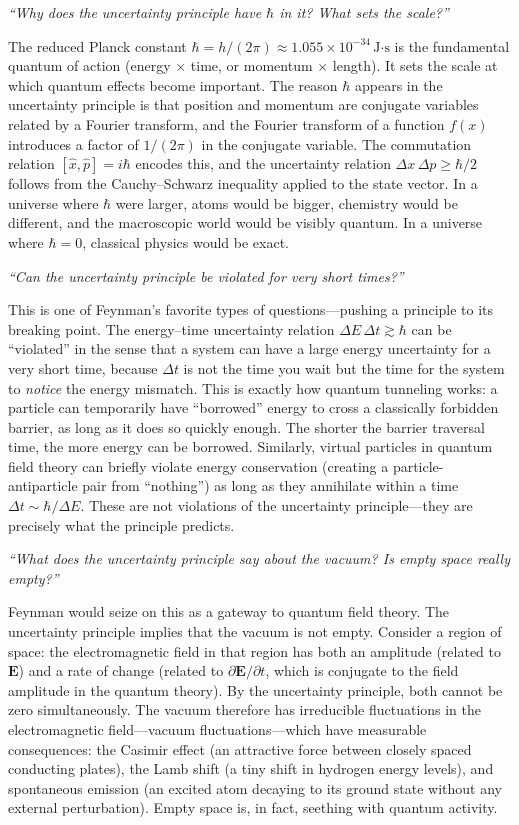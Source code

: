 \documentclass[11pt,openright]{book}
\begin{document}
\textit{``Why does the uncertainty principle have $\hbar$ in it? What sets the scale?''}

The reduced Planck constant $\hbar = h/(2\pi) \approx 1.055 \times 10^{-34}\,\text{J·s}$ is the fundamental quantum of action (energy $\times$ time, or momentum $\times$ length). It sets the scale at which quantum effects become important. The reason $\hbar$ appears in the uncertainty principle is that position and momentum are conjugate variables related by a Fourier transform, and the Fourier transform of a function $f(x)$ introduces a factor of $1/(2\pi)$ in the conjugate variable. The commutation relation $[\hat{x},\hat{p}] = i\hbar$ encodes this, and the uncertainty relation $\Delta x\,\Delta p \geq \hbar/2$ follows from the Cauchy--Schwarz inequality applied to the state vector. In a universe where $\hbar$ were larger, atoms would be bigger, chemistry would be different, and the macroscopic world would be visibly quantum. In a universe where $\hbar = 0$, classical physics would be exact.

\textit{``Can the uncertainty principle be violated for very short times?''}

This is one of Feynman's favorite types of questions---pushing a principle to its breaking point. The energy--time uncertainty relation $\Delta E\,\Delta t \gtrsim \hbar$ can be ``violated'' in the sense that a system can have a large energy uncertainty for a very short time, because $\Delta t$ is not the time you wait but the time for the system to \emph{notice} the energy mismatch. This is exactly how quantum tunneling works: a particle can temporarily have ``borrowed'' energy to cross a classically forbidden barrier, as long as it does so quickly enough. The shorter the barrier traversal time, the more energy can be borrowed. Similarly, virtual particles in quantum field theory can briefly violate energy conservation (creating a particle-antiparticle pair from ``nothing'') as long as they annihilate within a time $\Delta t \sim \hbar/\Delta E$. These are not violations of the uncertainty principle---they are precisely what the principle predicts.

\textit{``What does the uncertainty principle say about the vacuum? Is empty space really empty?''}

Feynman would seize on this as a gateway to quantum field theory. The uncertainty principle implies that the vacuum is not empty. Consider a region of space: the electromagnetic field in that region has both an amplitude (related to $\mathbf{E}$) and a rate of change (related to $\partial\mathbf{E}/\partial t$, which is conjugate to the field amplitude in the quantum theory). By the uncertainty principle, both cannot be zero simultaneously. The vacuum therefore has irreducible fluctuations in the electromagnetic field---vacuum fluctuations---which have measurable consequences: the Casimir effect (an attractive force between closely spaced conducting plates), the Lamb shift (a tiny shift in hydrogen energy levels), and spontaneous emission (an excited atom decaying to its ground state without any external perturbation). Empty space is, in fact, seething with quantum activity.
\end{document}
